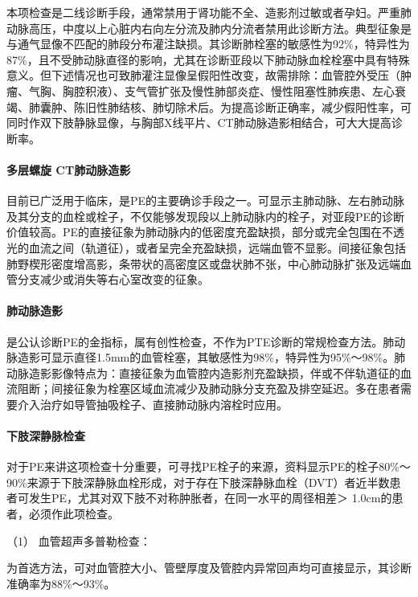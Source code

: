 本项检查是二线诊断手段，通常禁用于肾功能不全、造影剂过敏或者孕妇。严重肺动脉高压，中度以上心脏内右向左分流及肺内分流者禁用此诊断方法。典型征象是与通气显像不匹配的肺段分布灌注缺损。其诊断肺栓塞的敏感性为92\%，特异性为87\%，且不受肺动脉直径的影响，尤其在诊断亚段以下肺动脉血栓栓塞中具有特殊意义。但下述情况也可致肺灌注显像呈假阳性改变，故需排除：血管腔外受压（肿瘤、气胸、胸腔积液）、支气管扩张及慢性肺部炎症、慢性阻塞性肺疾患、左心衰竭、肺囊肿、陈旧性肺结核、肺切除术后。为提高诊断正确率，减少假阳性率，可同时作双下肢静脉显像，与胸部X线平片、CT肺动脉造影相结合，可大大提高诊断率。

\paragraph{多层螺旋 CT肺动脉造影}

目前已广泛用于临床，是PE的主要确诊手段之一。可显示主肺动脉、左右肺动脉及其分支的血栓或栓子，不仅能够发现段以上肺动脉内的栓子，对亚段PE的诊断价值较高。PE的直接征象为肺动脉内的低密度充盈缺损，部分或完全包围在不透光的血流之间（轨道征），或者呈完全充盈缺损，远端血管不显影。间接征象包括肺野楔形密度增高影，条带状的高密度区或盘状肺不张，中心肺动脉扩张及远端血管分支减少或消失等右心室改变的征象。

\paragraph{肺动脉造影}

是公认诊断PE的金指标，属有创性检查，不作为PTE诊断的常规检查方法。肺动脉造影可显示直径1.5mm的血管栓塞，其敏感性为98\%，特异性为95\%～98\%。肺动脉造影影像特点为：直接征象为血管腔内造影剂充盈缺损，伴或不伴轨道征的血流阻断；间接征象为栓塞区域血流减少及肺动脉分支充盈及排空延迟。多在患者需要介入治疗如导管抽吸栓子、直接肺动脉内溶栓时应用。

\paragraph{下肢深静脉检查}

对于PE来讲这项检查十分重要，可寻找PE栓子的来源，资料显示PE的栓子80\%～90\%来源于下肢深静脉血栓形成，对于存在下肢深静脉血栓（DVT）者近半数患者可发生PE，尤其对双下肢不对称肿胀者，在同一水平的周径相差＞
1.0cm的患者，必须作此项检查。

\hypertarget{text00278.htmlux5cux23CHP9-8-2-2-8-1}{}
（1） 血管超声多普勒检查：

为首选方法，可对血管腔大小、管壁厚度及管腔内异常回声均可直接显示，其诊断准确率为88\%～93\%。

